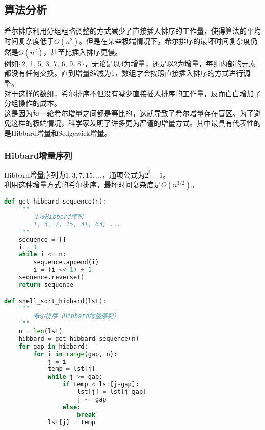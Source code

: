 \subsection{算法分析}

希尔排序利用分组粗略调整的方式减少了直接插入排序的工作量，使得算法的平均时间复杂度低于$ O(n^2) $。但是在某些极端情况下，希尔排序的最坏时间复杂度仍然是$ O(n^2) $，甚至比插入排序更慢。 \\

例如\{2, 1, 5, 3, 7, 6, 9, 8\}，无论是以4为增量，还是以2为增量，每组内部的元素都没有任何交换。直到增量缩减为1，数组才会按照直接插入排序的方式进行调整。 \\

对于这样的数组，希尔排序不但没有减少直接插入排序的工作量，反而白白增加了分组操作的成本。 \\

这是因为每一轮希尔增量之间都是等比的，这就导致了希尔增量存在盲区。为了避免这样的极端情况，科学家发明了许多更为严谨的增量方式。其中最具有代表性的是Hibbard增量和Sedgewick增量。

\subsubsection{Hibbard增量序列}

Hibbard增量序列为$ 1, 3, 7, 15, \dots $，通项公式为$ 2^i - 1 $。 \\

利用这种增量方式的希尔排序，最坏时间复杂度是$ O(n^{3/2}) $。 \\


\begin{lstlisting}[language=Python]
def get_hibbard_sequence(n):
    """
        生成Hibbard序列
        1, 3, 7, 15, 31, 63, ...
    """
    sequence = []
    i = 1
    while i <= n:
        sequence.append(i)
        i = (i << 1) + 1
    sequence.reverse()
    return sequence

def shell_sort_hibbard(lst):
    """
        希尔排序（Hibbard增量序列）
    """
    n = len(lst)
    hibbard = get_hibbard_sequence(n)
    for gap in hibbard:
        for i in range(gap, n):
            j = i
            temp = lst[j]
            while j >= gap:
                if temp < lst[j-gap]:
                    lst[j] = lst[j-gap]
                    j -= gap
                else:
                    break
            lst[j] = temp
\end{lstlisting}


